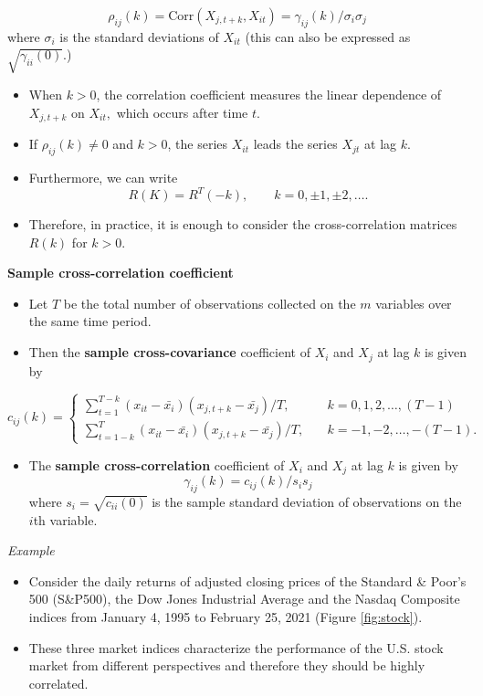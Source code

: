 \documentclass[]{book}
\providecommand{\tightlist}{%
  \setlength{\itemsep}{0pt}\setlength{\parskip}{0pt}}
\begin{document}
\[\rho_{ij}(k)= \text{Corr}(X_{j,t+k}, X_{it} )=\gamma_{ij}(k)/\sigma_i\sigma_j\]
where \(\sigma_i\) is the standard deviations of \(X_{it}\) (this can also be expressed as \(\sqrt{\gamma_{ii}(0)}.\))

\begin{itemize}
\item
  When \(k>0\), the correlation coefficient measures the linear dependence of \(X_{j, t+k}\) on \(X_{it},\) which occurs after time \(t\).
\item
  If \(\rho_{ij}(k)\neq0\) and \(k>0\), the series \(X_{it}\) leads the series \(X_{jt}\) at lag \(k\).
\item
  Furthermore, we can write
  \[R(K)=R^T(-k), \quad \quad k=0, \pm1, \pm2, \dots.\]
\item
  Therefore, in practice, it is enough to consider the cross-correlation matrices \(R(k)\) for \(k>0\).
\end{itemize}

\textbf{Sample cross-correlation coefficient}

\begin{itemize}
\tightlist
\item
  Let \(T\) be the total number of observations collected on the \(m\) variables over the same time period.
\item
  Then the \textbf{sample cross-covariance} coefficient of \(X_i\) and \(X_j\) at lag \(k\) is given by
\end{itemize}

\[
    c_{ij}(k)= 
\begin{cases}
    \sum_{t=1}^{T-k}(x_{it}-\bar{x_i})(x_{j,t+k}-\bar{x_j})/ T,& \quad k=0, 1,2, \dots,(T-1)\\
\sum_{t=1-k}^{T}(x_{it}-\bar{x_i})(x_{j,t+k}-\bar{x_j})/ T,& \quad k=-1,-2, \dots,-(T-1).
\end{cases}
\]

\begin{itemize}
\tightlist
\item
  The \textbf{sample cross-correlation} coefficient of \(X_i\) and \(X_j\) at lag \(k\) is given by
  \[\gamma_{ij}(k)=c_{ij}(k)/s_is_j\]
  where \(s_i=\sqrt{c_{ii}(0)}\) is the sample standard deviation of observations on the \(i\)th variable.
\end{itemize}

\emph{Example}

\begin{itemize}
\tightlist
\item
  Consider the daily returns of adjusted closing prices of the Standard \& Poor's 500 (S\&P500), the Dow Jones Industrial Average and the Nasdaq Composite indices from January 4, 1995 to February 25, 2021 (Figure \ref{fig:stock}).
\item
  These three market indices characterize the performance of the U.S. stock market from different perspectives and therefore they should be highly correlated.
\end{itemize}
\end{document}
